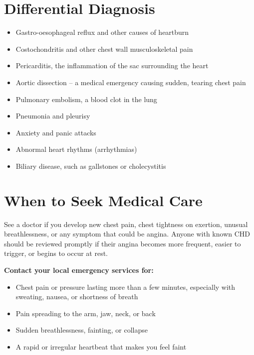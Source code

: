 \section*{Differential Diagnosis}
\begin{itemize}
    \item Gastro-oesophageal reflux and other causes of heartburn
    \item Costochondritis and other chest wall musculoskeletal pain
    \item Pericarditis, the inflammation of the sac surrounding the heart
    \item Aortic dissection -- a medical emergency causing sudden, tearing chest pain
    \item Pulmonary embolism, a blood clot in the lung
    \item Pneumonia and pleurisy
    \item Anxiety and panic attacks
    \item Abnormal heart rhythms (arrhythmias)
    \item Biliary disease, such as gallstones or cholecystitis
\end{itemize}

\section*{When to Seek Medical Care}
See a doctor if you develop new chest pain, chest tightness on exertion, unusual breathlessness, or any symptom that could be angina. Anyone with known CHD should be reviewed promptly if their angina becomes more frequent, easier to trigger, or begins to occur at rest.

\medskip
\textbf{Contact your local emergency services for:}
\begin{itemize}
    \item Chest pain or pressure lasting more than a few minutes, especially with sweating, nausea, or shortness of breath
    \item Pain spreading to the arm, jaw, neck, or back
    \item Sudden breathlessness, fainting, or collapse
    \item A rapid or irregular heartbeat that makes you feel faint
\end{itemize}

